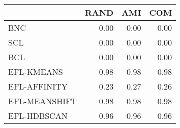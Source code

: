 \begin{tabular}{lrrr}
\toprule
 & RAND & AMI & COM \\
\midrule
BNC & 0.00 & 0.00 & 0.00 \\
SCL & 0.00 & 0.00 & 0.00 \\
BCL & 0.00 & 0.00 & 0.00 \\
EFL-KMEANS & 0.98 & 0.98 & 0.98 \\
EFL-AFFINITY & 0.23 & 0.27 & 0.26 \\
EFL-MEANSHIFT & 0.98 & 0.98 & 0.98 \\
EFL-HDBSCAN & 0.96 & 0.96 & 0.96 \\
\bottomrule
\end{tabular}
